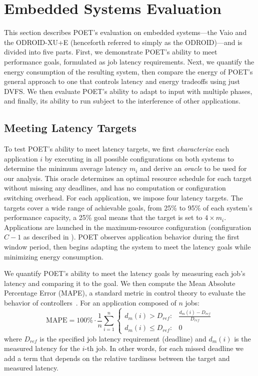 \section{Embedded Systems Evaluation}
\label{sec:poet-embedded-evaluation}

This section describes POET's evaluation on embedded systems---the Vaio and the ODROID-XU+E (henceforth referred to simply as the ODROID)---and is divided into five parts.
First, we demonstrate POET's ability to meet performance goals, formulated as job latency requirements.
Next, we quantify the energy consumption of the resulting system, then compare the energy of POET's general approach to one that controls latency and energy tradeoffs using just DVFS.
We then evaluate POET's ability to adapt to input with multiple phases, and finally, its ability to run subject to the interference of other applications.


\subsection{Meeting Latency Targets}
\label{sec:poet-eval-embedded-performance}

To test POET's ability to meet latency targets, we first \emph{characterize} each application $i$ by executing in all possible configurations on both systems to determine the minimum average latency $m_i$ and derive an \emph{oracle} to be used for our analysis.
This oracle determines an optimal resource schedule for each target without missing any deadlines, and has no computation or configuration switching overhead.
For each application, we impose four latency targets.
The targets cover a wide range of achievable goals, from 25\% to 95\% of each system's performance capacity, \ie a 25\% goal means that the target is set to $4 \times m_i$.
Applications are launched in the maximum-resource configuration (configuration $C-1$ as described in ).
POET observes application behavior during the first window period, then begins adapting the system to meet the latency goals while minimizing energy consumption.

We quantify POET's ability to meet the latency goals by measuring each job's latency and comparing it to the goal.
We then compute the Mean Absolute Percentage Error (MAPE), a standard metric in control theory to evaluate the behavior of controllers~\cite{ICSE2014}.
For an application composed of $n$ jobs:
\begin{equation}
\text{MAPE} = 100\% \cdot \frac{1}{n} \sum\limits_{i=1}^{n}
\left \{
\begin{array}{ll}
d_m(i) > D_{ref}  :& \frac{d_m(i) - D_{ref}}{D_{ref}} \\
d_m(i) \le D_{ref}  :& 0
\end{array} \right.
 \label{eqn:poet-mape}
\end{equation}
where $D_{ref}$ is the specified job latency requirement (deadline) and $d_m(i)$ is the measured latency for the $i$-th job.
In other words, for each missed deadline we add a term that depends on the relative tardiness between the target and measured latency.


